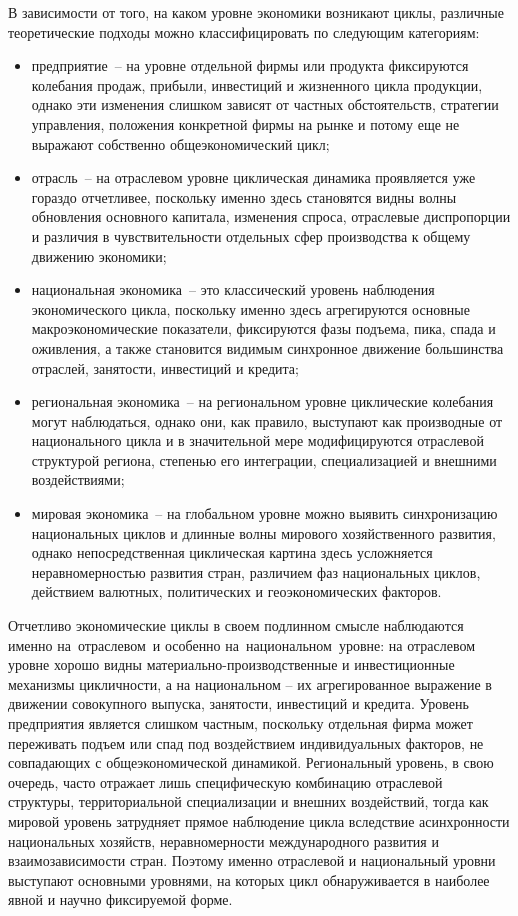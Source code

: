 В зависимости от того, на каком уровне экономики возникают циклы, различные теоретические подходы можно классифицировать по следующим категориям:
\begin{itemize}
    \item предприятие – на уровне отдельной фирмы или продукта фиксируются колебания продаж, прибыли, инвестиций и жизненного цикла продукции, однако эти изменения слишком зависят от частных обстоятельств, стратегии управления, положения конкретной фирмы на рынке и потому еще не выражают собственно общеэкономический цикл;
    \item отрасль – на отраслевом уровне циклическая динамика проявляется уже гораздо отчетливее, поскольку именно здесь становятся видны волны обновления основного капитала, изменения спроса, отраслевые диспропорции и различия в чувствительности отдельных сфер производства к общему движению экономики;
    \item национальная экономика – это классический уровень наблюдения экономического цикла, поскольку именно здесь агрегируются основные макроэкономические показатели, фиксируются фазы подъема, пика, спада и оживления, а также становится видимым синхронное движение большинства отраслей, занятости, инвестиций и кредита;
    \item региональная экономика – на региональном уровне циклические колебания могут наблюдаться, однако они, как правило, выступают как производные от национального цикла и в значительной мере модифицируются отраслевой структурой региона, степенью его интеграции, специализацией и внешними воздействиями;
    \item мировая экономика – на глобальном уровне можно выявить синхронизацию национальных циклов и длинные волны мирового хозяйственного развития, однако непосредственная циклическая картина здесь усложняется неравномерностью развития стран, различием фаз национальных циклов, действием валютных, политических и геоэкономических факторов.
\end{itemize}

Отчетливо экономические циклы в своем подлинном смысле наблюдаются именно на отраслевом и особенно на национальном уровне: на отраслевом уровне хорошо видны материально-производственные и инвестиционные механизмы цикличности, а на национальном – их агрегированное выражение в движении совокупного выпуска, занятости, инвестиций и кредита. Уровень предприятия является слишком частным, поскольку отдельная фирма может переживать подъем или спад под воздействием индивидуальных факторов, не совпадающих с общеэкономической динамикой. Региональный уровень, в свою очередь, часто отражает лишь специфическую комбинацию отраслевой структуры, территориальной специализации и внешних воздействий, тогда как мировой уровень затрудняет прямое наблюдение цикла вследствие асинхронности национальных хозяйств, неравномерности международного развития и взаимозависимости стран. Поэтому именно отраслевой и национальный уровни выступают основными уровнями, на которых цикл обнаруживается в наиболее явной и научно фиксируемой форме.

